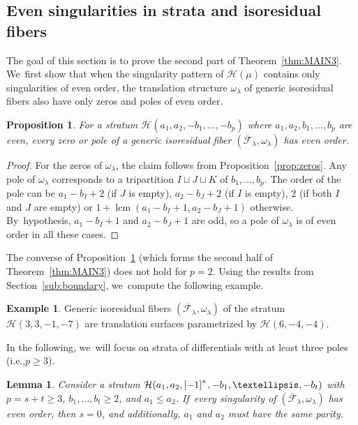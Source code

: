 \documentclass[11pt]{article}
\newcommand{\ie}{i.e.,\xspace}
\DeclareMathOperator{\lcm}{lcm}
\newtheorem{prop}[thm]{Proposition}
\newtheorem{lem}[thm]{Lemma}
\theoremstyle{definition}
\newtheorem{ex}[thm]{Example}
\begin{document}
\subsection{Even singularities in strata and isoresidual fibers}\label{sub:7even}

The goal of this section is to prove the second part of Theorem~\ref{thm:MAIN3}. We~first show that when the singularity pattern of $\mathcal{H}(\mu)$ contains only singularities of even order, the translation structure $\omega_\lambda$ of generic isoresidual fibers also have only zeros and poles of even order.

\begin{prop}\label{prop:Sec7Direct}
For a stratum $\mathcal{H}(a_{1},a_{2},-b_{1},\dots,-b_{p})$ where $a_{1},a_{2},b_{1},\dots,b_{p}$ are even, every zero or pole of a generic isoresidual fiber $(\overline{\mathcal{F}}_{\lambda},\omega_{\lambda})$ has even order.
\end{prop}

\begin{proof}
For the zeros of $\omega_{\lambda}$, the claim follows from Proposition~\ref{prop:zeros}. Any pole of $\omega_{\lambda}$ corresponds to a tripartition $I \sqcup J \sqcup K$ of $b_{1},\dots,b_{p}$. The order of the pole can be $a_{1}-b_{I}+2$ (if $J$ is empty), $a_{2}-b_{J}+2$ (if $I$ is empty), $2$ (if both $I$ and $J$ are empty) or $1+\lcm(a_{1}-b_{I}+1,a_{2}-b_{J}+1)$ otherwise. By~hypothesis, $a_{1}-b_{I}+1$ and $a_{2}-b_{J}+1$ are odd, so a pole of $\omega_{\lambda}$ is of even order in all these cases.
\end{proof}

The converse of Proposition~\ref{prop:Sec7Direct} (which forms the second half of Theorem~\ref{thm:MAIN3}) does not hold for $p=2$. Using the results from Section~\ref{sub:boundary}, we~compute the following example.

\begin{ex}
Generic isoresidual fibers $(\overline{\mathcal{F}}_{\lambda},\omega_{\lambda})$ of the stratum $\mathcal{H}(3,3,-1,-7)$ are translation surfaces parametrized by $\mathcal{H}(6,-4,-4)$.
\end{ex}

In the following, we~will focus on strata of differentials with at least three poles (\ie $p\geq 3$).

\begin{lem}\label{lem:nosimplepole}
Consider a stratum $\mathcal{H}(a_{1},a_{2},\rec[-1][s],-b_{1},\dots,-b_{t})$ with $p=s+t \geq 3$, $b_{1},\dots,b_{t} \geq 2$, and $a_{1} \leq a_{2}$. If~every singularity of $(\overline{\mathcal{F}}_{\lambda},\omega_{\lambda})$ has even order, then $s=0$, and additionally, $a_{1}$ and $a_{2}$ must have the same parity.
\end{lem}
\end{document}
